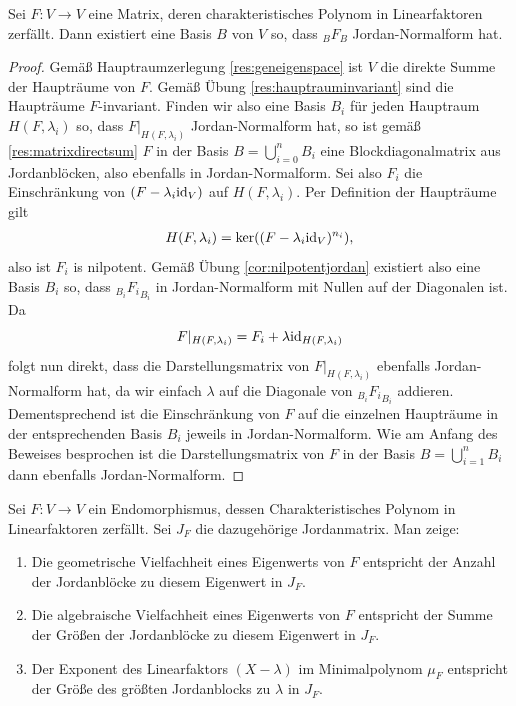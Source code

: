 \documentclass[10pt]{article}
\begin{document}
	\begin{corollary}
		Sei $F : V \to V$ eine Matrix, deren charakteristisches Polynom in Linearfaktoren zerfällt. Dann existiert eine Basis $B$ von $V$ so, dass $_BF_B$ Jordan-Normalform hat.
	\end{corollary}
	\begin{proof}
		Gemäß Hauptraumzerlegung \ref{res:geneigenspace} ist $V$ die direkte Summe der Haupträume von $F$.
		Gemäß Übung \ref{res:hauptrauminvariant} sind die Haupträume $F$-invariant. Finden wir also eine Basis $B_i$ für jeden Hauptraum $H(F, \lambda_i)$ so, dass $F|_{H(F, \lambda_i)}$ Jordan-Normalform hat, so ist gemäß \ref{res:matrixdirectsum} $F$ in der Basis $B = \bigcup_{i = 0}^n B_i$ eine Blockdiagonalmatrix aus Jordanblöcken, also ebenfalls in Jordan-Normalform.
		\newpar
		Sei also $F_i$ die Einschränkung von $(F - \lambda_i \textnormal{id}_V)$ auf $H(F, \lambda_i)$.
		Per Definition der Haupträume gilt
		\begin{align*}
			H(F, \lambda_i) = \ker((F - \lambda_i \textnormal{id}_V)^{n_i}),
		\end{align*}
		also ist $F_i$ is nilpotent. Gemäß Übung \ref{cor:nilpotentjordan} existiert also eine Basis $B_i$ so, dass $_{B_i}{F_i}_{B_i}$ in Jordan-Normalform mit Nullen auf der Diagonalen ist. 
		Da $$F|_{H(F, \lambda_i)} = F_i + \lambda{\textnormal{id}_{H(F, \lambda_i)}}$$
		folgt nun direkt, dass die Darstellungsmatrix von $F|_{H(F, \lambda_i)}$ ebenfalls Jordan-Normalform hat, da wir einfach $\lambda$ auf die Diagonale von $_{B_i}{F_i}_{B_i}$ addieren.
		\newpar
		Dementsprechend ist die Einschränkung von $F$ auf die einzelnen Haupträume in der entsprechenden Basis $B_i$ jeweils in Jordan-Normalform. Wie am Anfang des Beweises besprochen ist die Darstellungsmatrix von $F$ in der Basis $B = \bigcup_{i = 1}^n B_i$ dann ebenfalls Jordan-Normalform.
	\end{proof}
	\begin{exercise}
		Sei $F : V \to V$ ein Endomorphismus, dessen Charakteristisches Polynom in Linearfaktoren zerfällt. Sei $J_F$ die dazugehörige Jordanmatrix. Man zeige:
		\begin{enumerate}
			\item Die geometrische Vielfachheit eines Eigenwerts von $F$ entspricht der Anzahl der Jordanblöcke zu diesem Eigenwert in $J_F$.
			\item Die algebraische Vielfachheit eines Eigenwerts von $F$ entspricht der Summe der Größen der Jordanblöcke zu diesem Eigenwert in $J_F$.
			\item Der Exponent des Linearfaktors $(X - \lambda)$ im Minimalpolynom $\mu_F$ entspricht der Größe des größten Jordanblocks zu $\lambda$ in $J_F$.
		\end{enumerate}
	\end{exercise}
\end{document}
